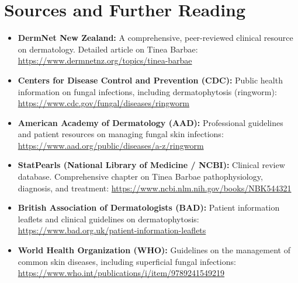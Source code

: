\section*{Sources and Further Reading}
\begin{itemize}
    \item \textbf{DermNet New Zealand:} A comprehensive, peer-reviewed clinical resource on dermatology. Detailed article on Tinea Barbae: \url{https://www.dermnetnz.org/topics/tinea-barbae}
    \item \textbf{Centers for Disease Control and Prevention (CDC):} Public health information on fungal infections, including dermatophytosis (ringworm): \url{https://www.cdc.gov/fungal/diseases/ringworm}
    \item \textbf{American Academy of Dermatology (AAD):} Professional guidelines and patient resources on managing fungal skin infections: \url{https://www.aad.org/public/diseases/a-z/ringworm}
    \item \textbf{StatPearls (National Library of Medicine / NCBI):} Clinical review database. Comprehensive chapter on Tinea Barbae pathophysiology, diagnosis, and treatment: \url{https://www.ncbi.nlm.nih.gov/books/NBK544321}
    \item \textbf{British Association of Dermatologists (BAD):} Patient information leaflets and clinical guidelines on dermatophytosis: \url{https://www.bad.org.uk/patient-information-leaflets}
    \item \textbf{World Health Organization (WHO):} Guidelines on the management of common skin diseases, including superficial fungal infections: \url{https://www.who.int/publications/i/item/9789241549219}
\end{itemize}